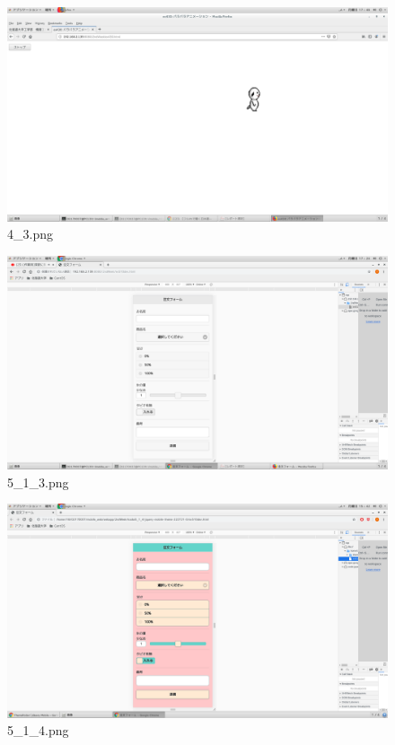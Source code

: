 \documentclass[a4j]{jarticle}
\begin{document}
  \vspace{1cm}
  \begin{figure}[htbp]
    \centering
    \includegraphics[width=13cm]{../webapp/png/4_3.png}
    \caption{4\_3.png}
  \end{figure}

  \vspace{1cm}
  \begin{figure}[htbp]
    \centering
    \includegraphics[width=13cm]{../webapp/png/5_1_3.png}
    \caption{5\_1\_3.png}
  \end{figure}

  \vspace{1cm}
  \begin{figure}[htbp]
    \centering
    \includegraphics[width=13cm]{../webapp/png/5_1_4.png}
    \caption{5\_1\_4.png}
  \end{figure}
\end{document}
